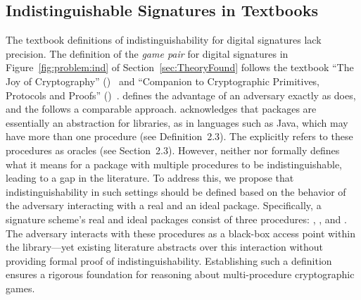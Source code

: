 \subsection{Indistinguishable Signatures in Textbooks}
%
The textbook definitions of indistinguishability for digital signatures lack precision. 
%
The definition of the \emph{game pair} for digital signatures
in Figure~\ref{fig:problem:ind} of Section~\ref{sec:TheoryFound}
follows the textbook ``The Joy of Cryptography'' (\joc)~\cite{joy} and
``Companion to Cryptographic Primitives, Protocols and Proofs'' (\companion)~\cite{companion}.
%
\joc defines the advantage of an adversary exactly as \ssprove does, 
and the \companion follows a comparable approach. 
%
%
%
\joc acknowledges that packages are essentially an
abstraction for libraries, as in languages such as Java, 
which may have more than one procedure (see Definition~2.3).
%
The \companion explicitly refers to these procedures as oracles (see Section~2.3).
%
However, neither \joc nor \companion formally defines what it means for a package 
with multiple procedures to be indistinguishable, leading to a gap in the literature. 
%
To address this, we propose that indistinguishability in such settings should be 
defined based on the behavior of the adversary interacting with a real and an ideal package. 
%
Specifically, a signature scheme's real and ideal packages consist of three procedures: \egetpk, \esign, and \eversig. 
%
The adversary interacts with these procedures as a black-box access point within the library—yet existing 
literature abstracts over this interaction without providing formal proof of indistinguishability. 
%
Establishing such a definition ensures a rigorous foundation for reasoning about multi-procedure cryptographic games. 

